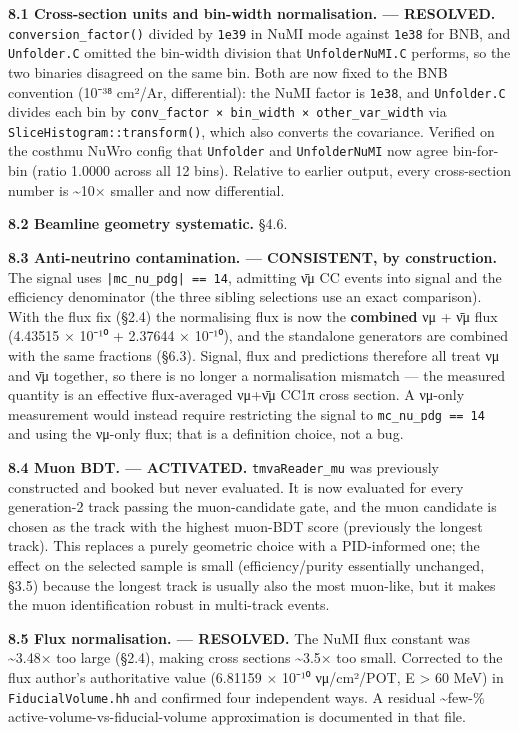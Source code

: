 \documentclass[11pt]{article}
\begin{document}
\textbf{8.1 Cross-section units and bin-width normalisation. — RESOLVED.} \texttt{conversion\_factor()} divided by \texttt{1e39} in NuMI mode against \texttt{1e38} for BNB, and \texttt{Unfolder.C} omitted the bin-width division that \texttt{UnfolderNuMI.C} performs, so the two binaries disagreed on the same bin. Both are now fixed to the BNB convention (10⁻³⁸ cm²/Ar, differential): the NuMI factor is \texttt{1e38}, and \texttt{Unfolder.C} divides each bin by \texttt{conv\_factor × bin\_width × other\_var\_width} via \texttt{SliceHistogram::transform()}, which also converts the covariance. Verified on the costhmu NuWro config that \texttt{Unfolder} and \texttt{UnfolderNuMI} now agree bin-for-bin (ratio 1.0000 across all 12 bins). Relative to earlier output, every cross-section number is \textasciitilde{}10× smaller and now differential.

\textbf{8.2 Beamline geometry systematic.} §4.6.

\textbf{8.3 Anti-neutrino contamination. — CONSISTENT, by construction.} The signal uses \texttt{|mc\_nu\_pdg| == 14}, admitting ν̄μ CC events into signal and the efficiency denominator (the three sibling selections use an exact comparison). With the flux fix (§2.4) the normalising flux is now the \textbf{combined} νμ + ν̄μ flux (4.43515 × 10⁻¹⁰ + 2.37644 × 10⁻¹⁰), and the standalone generators are combined with the same fractions (§6.3). Signal, flux and predictions therefore all treat νμ and ν̄μ together, so there is no longer a normalisation mismatch — the measured quantity is an effective flux-averaged νμ+ν̄μ CC1π cross section. A νμ-only measurement would instead require restricting the signal to \texttt{mc\_nu\_pdg == 14} and using the νμ-only flux; that is a definition choice, not a bug.

\textbf{8.4 Muon BDT. — ACTIVATED.} \texttt{tmvaReader\_mu} was previously constructed and booked but never evaluated. It is now evaluated for every generation-2 track passing the muon-candidate gate, and the muon candidate is chosen as the track with the highest muon-BDT score (previously the longest track). This replaces a purely geometric choice with a PID-informed one; the effect on the selected sample is small (efficiency/purity essentially unchanged, §3.5) because the longest track is usually also the most muon-like, but it makes the muon identification robust in multi-track events.

\textbf{8.5 Flux normalisation. — RESOLVED.} The NuMI flux constant was \textasciitilde{}3.48× too large (§2.4), making cross sections \textasciitilde{}3.5× too small. Corrected to the flux author's authoritative value (6.81159 × 10⁻¹⁰ νμ/cm²/POT, E > 60 MeV) in \texttt{FiducialVolume.hh} and confirmed four independent ways. A residual \textasciitilde{}few-\% active-volume-vs-fiducial-volume approximation is documented in that file.
\end{document}
